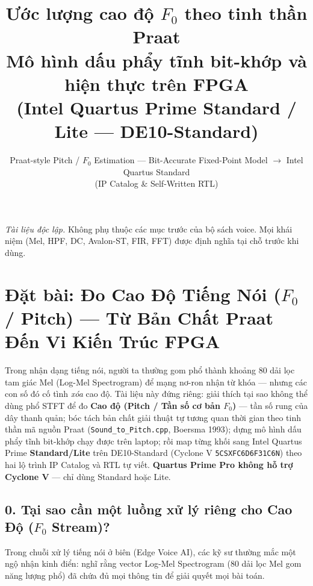 \documentclass[11pt,a4paper]{article}
\begin{document}
\title{\textbf{Ước lượng cao độ $F_0$ theo tinh thần Praat}\\[0.35em]
\large Mô hình dấu phẩy tĩnh bit-khớp và hiện thực trên FPGA\\[0.2em]
\large (Intel Quartus Prime Standard / Lite --- DE10-Standard)}
\author{Praat-style Pitch / $F_0$ Estimation --- Bit-Accurate Fixed-Point Model $\to$ Intel Quartus Standard\\(IP Catalog \& Self-Written RTL)}
\date{}
\maketitle

\noindent\textit{Tài liệu độc lập.} Không phụ thuộc các mục trước của bộ sách voice. Mọi khái niệm (Mel, HPF, DC, Avalon-ST, FIR, FFT) được định nghĩa tại chỗ trước khi dùng.

\section*{Đặt bài: Đo Cao Độ Tiếng Nói ($F_0$ / Pitch) --- Từ Bản Chất Praat Đến Vi Kiến Trúc FPGA}

\begin{learningobj}
Trong nhận dạng tiếng nói, người ta thường gom phổ thành khoảng 80 dải lọc tam giác Mel (Log-Mel Spectrogram) để mạng nơ-ron nhận từ khóa --- nhưng các con số đó cố tình \emph{xóa} cao độ. Tài liệu này đứng riêng: giải thích tại sao không thể dùng phổ STFT để đo \textbf{Cao độ (Pitch / Tần số cơ bản $F_0$)} --- tần số rung của dây thanh quản; bóc tách bản chất giải thuật tự tương quan thời gian theo tinh thần mã nguồn Praat (\texttt{Sound\_to\_Pitch.cpp}, Boersma 1993); dựng mô hình dấu phẩy tĩnh bit-khớp chạy được trên laptop; rồi map từng khối sang Intel Quartus Prime \textbf{Standard/Lite} trên DE10-Standard (Cyclone V \texttt{5CSXFC6D6F31C6N}) theo hai lộ trình IP Catalog và RTL tự viết. \textbf{Quartus Prime Pro không hỗ trợ Cyclone V} --- chỉ dùng Standard hoặc Lite.
\end{learningobj}

\subsection*{0. Tại sao cần một luồng xử lý riêng cho Cao Độ ($F_0$ Stream)?}

Trong chuỗi xử lý tiếng nói ở biên (Edge Voice AI), các kỹ sư thường mắc một ngộ nhận kinh điển: nghĩ rằng vector Log-Mel Spectrogram (80 dải lọc Mel gom năng lượng phổ) đã chứa đủ mọi thông tin để giải quyết mọi bài toán.
\end{document}

